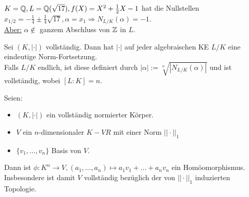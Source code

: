 \begin{Bsp}
$K=\mathbb{Q}, L=\mathbb{Q}(\sqrt{17}), f(X)=X^2+\frac{1}{2}X-1$ hat die Nullstellen $x_{1/2}=-\frac{1}{4} \pm \frac{1}{4} \sqrt{17}, \alpha=x_1 \Rightarrow N_{L/K}(\alpha)=-1$.\\
\underline{Aber:} $\alpha \not \in $ ganzem Abschluss von $\mathbb{Z}$ in $L$.
\end{Bsp} 

\begin{Satz}
Sei $(K, |\cdot|)$ vollständig. Dann hat $|\cdot|$ auf jeder algebraischen KE $L/K$ eine eindeutige Norm-Fortsetzung.\\
Falls $L/K$ endlich, ist diese definiert durch $|\alpha|:=\sqrt[n]{|N_{L/K}(\alpha)|}$ und ist vollständig, wobei $[L:K]=n$.
\end{Satz}

\begin{Prop}
Seien:
\begin{itemize}
\item $(K, |\cdot|)$ ein vollständig normierter Körper.
\item $V$ ein $n$-dimensionaler $K-VR$ mit einer Norm $||\cdot||_1$
\item $\{v_1, \dots, v_n\}$ Basis von $V$.
\end{itemize}
Dann ist $\phi: K^n \to V, (a_1, \dots, a_n) \mapsto a_1 v_1 + \dots + a_nv_n$ ein Homöomorphismus. Insbesondere ist damit $V$ vollständig bezüglich der von $|| \cdot ||_1$ induzierten Topologie.
\end{Prop}

